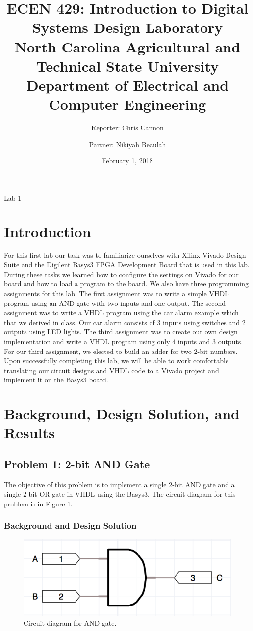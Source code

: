 \documentclass[11pt]{article}
\title {ECEN 429: Introduction to Digital Systems Design Laboratory \\ North Carolina Agricultural and Technical State University \\ Department of Electrical and Computer Engineering} %
\author{Reporter: Chris Cannon \\ \and Partner: Nikiyah Beaulah} %
\date{February 1, 2018}
\begin{document}
\maketitle %

\begin{center}
Lab	1
\end{center}

\pagebreak

\section{Introduction}
For this first lab our task was to familiarize ourselves with Xilinx Vivado Design Suite and the Digilent Basys3 FPGA Development Board that is used in this lab. During these tasks we learned how to configure the settings on Vivado for our board and how to load a program to the board. We also have three programming assignments for this lab. The first assignment was to write a simple VHDL program using an AND gate with two inputs and one output. The second assignment was to write a VHDL program using the car alarm example which that we derived in class. Our car alarm consists of 3 inputs using switches and 2 outputs using LED lights.  The third assignment was to create our own design implementation and write a VHDL program using only 4 inputs and 3 outputs. For our third assignment, we elected to build an adder for two 2-bit numbers. Upon successfully completing this lab, we will be able to work comfortable translating our circuit designs and VHDL code to a Vivado project and implement it on the Basys3 board.

\section{Background, Design Solution, and Results}
\subsection{Problem 1: 2-bit AND Gate}
The objective of this problem is to implement a single 2-bit AND gate and a single 2-bit OR gate in VHDL using the Basys3. The circuit diagram for this problem is in Figure 1.

\subsubsection{Background and Design Solution}

\begin{figure}[h]
	\includegraphics[width=\textwidth]{report_images/img2}
	\caption{\label{fig:figure-name}Circuit diagram for AND gate.}
\end{figure}
\end{document}
